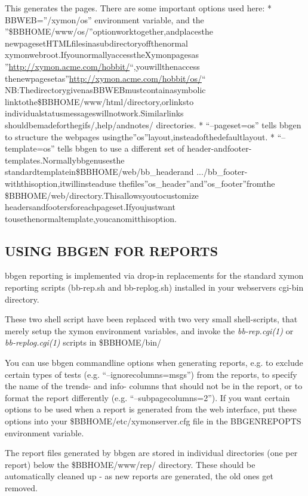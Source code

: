   This generates the pages. There are some important options used here:  
 * BBWEB=''/xymon/os'' environment variable, and the  
''\$BBHOME/www/os/''optionworktogether,andplacesthe  
newpagesetHTMLfilesinasubdirectoryoffthenormal  
xymonwebroot.IfyounormallyaccesstheXymonpagesas  
''\url{http://xymon.acme.com/hobbit/}``,youwillthenaccess  
thenewpagesetas''\url{http://xymon.acme.com/hobbit/os/}``  
NB:ThedirectorygivenasBBWEBmustcontainasymbolic  
linktothe\$BBHOME/www/html/directory,orlinksto  
individualstatusmessageswillnotwork.Similarlinks  
shouldbemadeforthegifs/,help/andnotes/  
directories.  
 * ``--pageset=os'' tells bbgen to structure the webpages  
usingthe''os''layout,insteadofthedefaultlayout.  
 * ``--template=os'' tells bbgen to use a different set of  
header-andfooter-templates.Normallybbgenusesthe  
standardtemplatein\$BBHOME/web/bb\_headerand  
.../bb\_footer-withthisoption,itwillinsteaduse  
thefiles''os\_header''and''os\_footer''fromthe  
\$BBHOME/web/directory.Thisallowsyoutocustomize  
headersandfootersforeachpageset.Ifyoujustwant  
tousethenormaltemplate,youcanomitthisoption. 


 
\subsection{USING BBGEN FOR REPORTS}
 bbgen reporting is implemented via drop-in replacements for the standard xymon reporting scripts (bb-rep.sh and bb-replog.sh) installed in your webservers cgi-bin directory. 

  These two shell script have been replaced with two very small
  shell-scripts, that merely setup the xymon environment variables,
  and invoke the \emph{bb-rep.cgi(1)} or \emph{bb-replog.cgi(1)}
  scripts in \$BBHOME/bin/ 



  You can use bbgen commandline options when generating reports,
  e.g. to exclude certain types of tests
  (e.g. ``--ignorecolumns=msgs'') from the reports, to specify the
  name of the trends- and info- columns that should not be in the
  report, or to format the report differently
  (e.g. ``--subpagecolumns=2''). If you want certain options to be
  used when a report is generated from the web interface, put these
  options into your \$BBHOME/etc/xymonserver.cfg file in the
  BBGENREPOPTS environment variable. 



  The report files generated by bbgen are stored in individual
  directories (one per report) below the \$BBHOME/www/rep/
  directory. These should be automatically cleaned up - as new reports
  are generated, the old ones get removed. 



